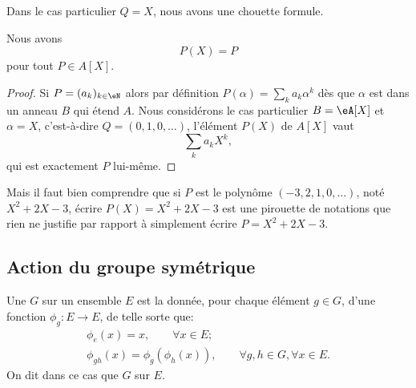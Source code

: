 Dans le cas particulier \( Q=X\), nous avons une chouette formule.
\begin{lemma}       \label{LEMooGKWQooVOyeDX}
    Nous avons
    \begin{equation}
        P(X)=P
    \end{equation}
    pour tout \( P\in A[X]\).
\end{lemma}

\begin{proof}
    Si \( P=(a_k)_{k\in \eN}\) alors par définition \( P(\alpha)=\sum_ka_k\alpha^k\) dès que \( \alpha\) est dans un anneau \( B\) qui étend \( A\). Nous considérons le cas particulier \( B=\eA[X]\) et \( \alpha=X\), c'est-à-dire \( Q=(0,1,0,\ldots)\), l'élément \( P(X)\) de \( A[X]\) vaut
    \begin{equation}        \label{EQooABULooFCEasf}
        \sum_ka_kX^k,
    \end{equation}
    qui est exactement \( P\) lui-même.
\end{proof}

Mais il faut bien comprendre que si \( P\) est le polynôme \( (-3,2,1,0,\ldots)\), noté \( X^2+2X-3\), écrire \( P(X)=X^2+2X-3\) est une pirouette de notations que rien ne justifie par rapport à simplement écrire \( P=X^2+2X-3\).



\subsection{Action du groupe symétrique}

\begin{definition}  \label{DefActionGroupe}
    Une  \( G\) sur un ensemble \( E\) est la donnée, pour chaque élément \( g \in G\), d'une fonction \(\phi_g : E \to E \), de telle sorte que:
    \begin{gather*}
        \phi_{e}(x) = x, \hspace{2em} \forall x \in E;\\
        \phi_{gh}(x) = \phi_g (\phi_h (x)),  \hspace{2em} \forall g,h \in G, \forall x \in E.
     \end{gather*}
     On dit dans ce cas que \( G \)  sur \( E \).
\end{definition}

